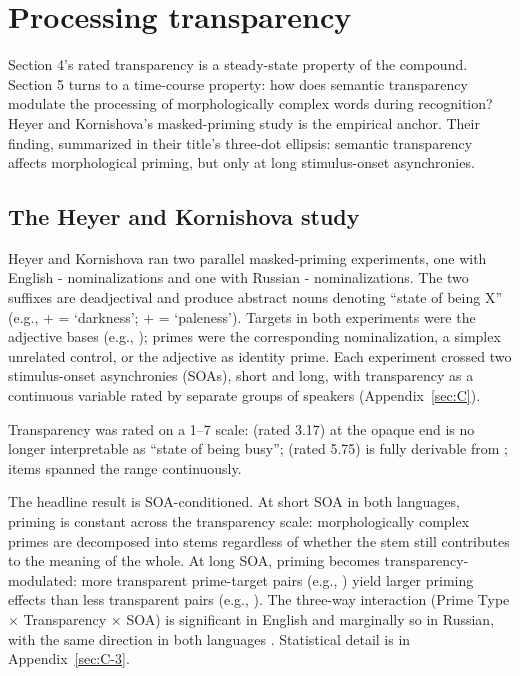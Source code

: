 \section{Processing transparency}\label{sec:5}

Section 4's rated transparency is a steady-state property of the compound. Section 5 turns to a time-course property: how does semantic transparency modulate the processing of morphologically complex words during recognition? Heyer and Kornishova's \autocite*{heyer-kornishova-2018-priming-eventually} masked-priming study is the empirical anchor. Their finding, summarized in their title's three-dot ellipsis: semantic transparency affects morphological priming, but only at long stimulus-onset asynchronies.

\subsection{The Heyer and Kornishova study}

Heyer and Kornishova \autocite*{heyer-kornishova-2018-priming-eventually} ran two parallel masked-priming experiments, one with English - nominalizations and one with Russian - nominalizations. The two suffixes are deadjectival and produce abstract nouns denoting \enquote{state of being X} (e.g.,  +  = `darkness';  +  =  `paleness'). Targets in both experiments were the adjective bases (e.g., ); primes were the corresponding nominalization, a simplex unrelated control, or the adjective as identity prime. Each experiment crossed two stimulus-onset asynchronies (SOAs), short and long, with transparency as a continuous variable rated by separate groups of speakers (Appendix~\ref{sec:C}).

Transparency was rated on a 1--7 scale:  (rated 3.17) at the opaque end is no longer interpretable as \enquote{state of being busy};  (rated 5.75) is fully derivable from ; items spanned the range continuously.

The headline result is SOA-conditioned. At short SOA in both languages, priming is constant across the transparency scale: morphologically complex primes are decomposed into stems regardless of whether the stem still contributes to the meaning of the whole. At long SOA, priming becomes transparency-modulated: more transparent prime-target pairs (e.g., ) yield larger priming effects than less transparent pairs (e.g., ). The three-way interaction (Prime Type × Transparency × SOA) is significant in English and marginally so in Russian, with the same direction in both languages \autocite[1117--1119]{heyer-kornishova-2018-priming-eventually}. Statistical detail is in Appendix~\ref{sec:C-3}.

